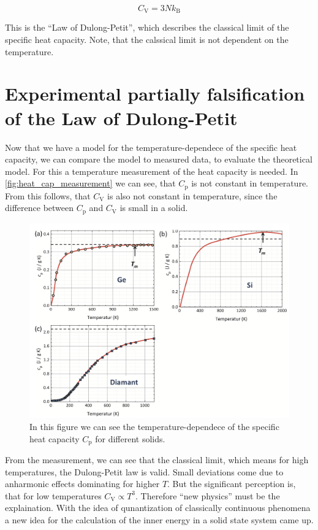 \begin{equation}
    \label{eqn:dulong_petit}
    C_\mathrm{V} = 3Nk_\mathrm{B}
\end{equation}

This is the \enquote{Law of Dulong-Petit}, which describes the classical limit of the specific heat capacity. Note, that the calssical limit is not dependent on the temperature.

\section{Experimental partially falsification of the Law of Dulong-Petit}
\label{sec:ueberleitung}
Now that we have a model for the temperature-dependece of the specific heat capacity, we can compare the model to measured data, to evaluate the theoretical model. For this a temperature
measurement of the heat capacity is needed. In \autoref{fig:heat_cap_measurement} we can see, that $C_\mathrm{p}$ is not constant in temperature. From this follows, that $C_\mathrm{V}$
is also not constant in temperature, since the difference between $C_\mathrm{p}$ and $C_\mathrm{V}$ is small in a solid.

\begin{figure}
    \centering
    \includegraphics[scale=0.4]{content/V47_pictures/heat_capacity.png}
    \caption{In this figure we can see the temperature-dependece of the specific heat capacity $C_\mathrm{p}$ for different solids. \cite{grossmarx}}
    \label{fig:heat_cap_measurement}
\end{figure}

From the measurement, we can see that the classical limit, which means for high temperatures, the Dulong-Petit law is valid. Small deviations come due to anharmonic effects dominating
for higher $T$. But the significant perception is, that for low temperatures $C_\mathrm{V} \propto T^3$. Therefore \enquote{new physics} must be the explaination. With the idea of qunantization
of classically continuous phenomena a new idea for the calculation of the inner energy in a solid state system came up.

